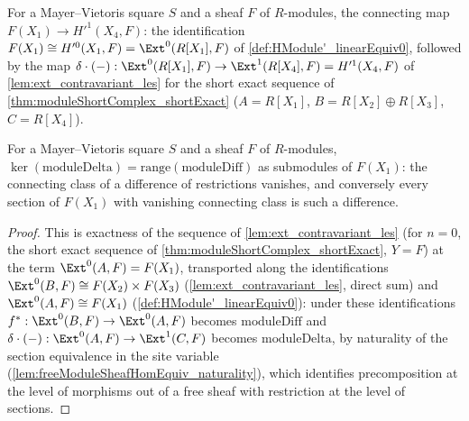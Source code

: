 \begin{definition}
  \label{def:moduleDelta}
  \leanok
  For a Mayer--Vietoris square \(S\) and a sheaf \(F\) of \(R\)-modules, the connecting map
  \(F(X_1) \to H'^1(X_4, F)\): the identification
  \(F(X_1) \cong H'^0(X_1,F) = \Ext^0(R[X_1], F)\) of \ref{def:HModule'_linearEquiv0},
  followed by the map \(\delta \cdot (-) : \Ext^0(R[X_1],F) \to \Ext^1(R[X_4],F) = H'^1(X_4,F)\)
  of \ref{lem:ext_contravariant_les} for the short exact sequence of
  \ref{thm:moduleShortComplex_shortExact} (\(A = R[X_1]\), \(B = R[X_2] \oplus R[X_3]\),
  \(C = R[X_4]\)).
\end{definition}

\begin{lemma}[Exactness at \(F(X_1)\)]
  \label{lem:mv_exact_at_X1}
  \leanok
  For a Mayer--Vietoris square \(S\) and a sheaf \(F\) of \(R\)-modules,
  \(\ker(\mathrm{moduleDelta}) = \mathrm{range}(\mathrm{moduleDiff})\) as submodules of
  \(F(X_1)\): the connecting class of a difference of restrictions vanishes, and conversely
  every section of \(F(X_1)\) with vanishing connecting class is such a difference.
\end{lemma}
\begin{proof}
  \leanok
  This is exactness of the sequence of \ref{lem:ext_contravariant_les} (for \(n=0\), the
  short exact sequence of \ref{thm:moduleShortComplex_shortExact}, \(Y=F\)) at the term
  \(\Ext^0(A,F) = F(X_1)\), transported along the identifications
  \(\Ext^0(B,F) \cong F(X_2) \times F(X_3)\) (\ref{lem:ext_contravariant_les}, direct sum) and
  \(\Ext^0(A,F) \cong F(X_1)\) (\ref{def:HModule'_linearEquiv0}): under these identifications
  \(f^* : \Ext^0(B,F) \to \Ext^0(A,F)\) becomes \(\mathrm{moduleDiff}\) and
  \(\delta \cdot (-) : \Ext^0(A,F) \to \Ext^1(C,F)\) becomes \(\mathrm{moduleDelta}\), by
  naturality of the section equivalence in the site variable
  (\ref{lem:freeModuleSheafHomEquiv_naturality}), which identifies precomposition at the
  level of morphisms out of a free sheaf with restriction at the level of sections.
\end{proof}

